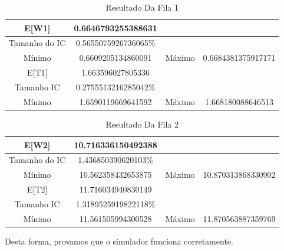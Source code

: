 \documentclass[a4paper,10pt]{article}
\begin{document}
	    \begin{table}[H] 
		  \centering
		  \begin{tabular}{|c|c|c|c|}
		        \hline
			 E[W1]         & 0.6646793255388631    &        &                           \\ \hline
			 Tamanho do IC & 0.5655075926736065$\%$& 	     &				\\ \hline
			 Mínimo        & 0.6609205134860091    & Máximo & 0.6684381375917171       \\ \hline
			 E[T1]         & 1.663596027805336     &	     &				\\ \hline	
			 Tamanho IC    & 0.2755513216285042$\%$&	     &		        \\ \hline
			 Mínimo        & 1.6590119669641592    & Máximo & 1.668180088646513	 \\ \hline
		  \end{tabular}
		  \caption{Resultado Da Fila 1} 
	    \end{table}
	    \begin{table}[H] 
		  \centering
		  \begin{tabular}{|c|c|c|c|}
		        \hline
			 E[W2]         & 10.716336150492388    &        &                           \\ \hline
			 Tamanho do IC & 1.436850390620103$\%$ & 	     &				\\ \hline
			 Mínimo        & 10.562358432653875    & Máximo & 10.870313868330902       \\ \hline
			 E[T2]         & 11.716034940830149     &	     &				\\ \hline	
			 Tamanho IC    & 1.3189525919822118$\%$    &	     &		        \\ \hline
			 Mínimo        & 11.561505994300528    & Máximo & 11.870563887359769	 \\ \hline
		  \end{tabular}
		  \caption{Resultado Da Fila 2}
	    \end{table}
	    Desta forma, provamos que o simulador funciona corretamente.
\end{document}
